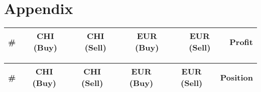 \documentclass[8 pt]{article}
\begin{document}
\section{Appendix}

\begin{center}
  \Large
  \label{table:cash}
  \begin{tabular}{|c|c|c|c|c|c|}
    \hline
    \# & CHI (Buy) & CHI (Sell) & EUR (Buy) & EUR (Sell) & Profit \\ \hline
    
  \end{tabular}
\end{center}

\vspace{1.0cm}

\begin{center}
  \Large
  \label{table:assets}
  \begin{tabular}{|c|c|c|c|c|c|}
    \hline
    \# & CHI (Buy) & CHI (Sell) & EUR (Buy) & EUR (Sell) & Position \\ \hline
    
  \end{tabular}
\end{center}
\end{document}

